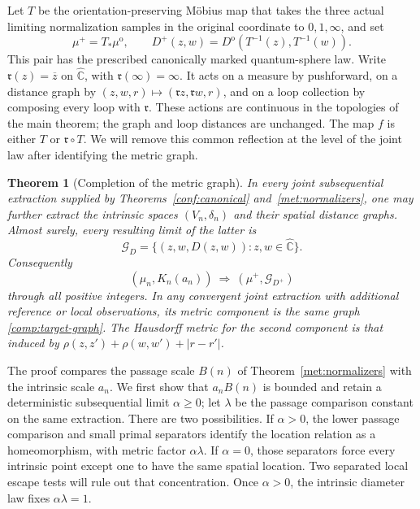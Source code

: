 \documentclass[11pt]{article}
\numberwithin{equation}{section}
\newtheorem{theorem}{Theorem}[section]
\theoremstyle{definition}
\theoremstyle{remark}
\newcommand{\Chat}{\widehat{\mathbb C}}
\newcommand{\1}{\mathbf 1}
\begin{document}
Let $T$ be the orientation-preserving M\"obius map that takes the
three actual limiting normalization samples in the original coordinate
to $0,1,\infty$, and set
\[
 \mu^+=T_*\mu^{\mathrm o},\qquad
 D^+(z,w)=D^{\mathrm o}(T^{-1}(z),T^{-1}(w)).
\]
This pair has the prescribed canonically marked quantum-sphere law.
Write $\mathfrak r(z)=\overline z$ on $\Chat$, with
$\mathfrak r(\infty)=\infty$.  It acts on a measure by pushforward,
on a distance graph by
$(z,w,r)\mapsto(\mathfrak r z,\mathfrak r w,r)$, and on a loop
collection by composing every loop with $\mathfrak r$.  These actions
are continuous in the topologies of the main theorem; the graph and
loop distances are unchanged.  The map $f$ is either $T$ or
$\mathfrak r\circ T$.  We will remove this common reflection at
the level of the joint law after identifying the metric graph.

\begin{theorem}[Completion of the metric graph]
\label{comp:metric-graph}
In every joint subsequential extraction supplied by
Theorems~\ref{conf:canonical} and~\ref{met:normalizers}, one may further
extract the intrinsic spaces $(V_n,\delta_n)$ and their spatial distance
graphs.  Almost surely, every resulting limit of the latter is
\begin{equation}
 \label{comp:target-graph}
 \mathcal G_D
   =\{(z,w,D(z,w)):z,w\in\Chat\}.
\end{equation}
Consequently
\[
 (\mu_n,K_n(a_n))\ \Longrightarrow\ (\mu^+,\mathcal G_{D^+})
\]
through all positive integers.  In any convergent joint extraction
with additional reference or local observations, its metric
component is the same graph \eqref{comp:target-graph}.  The
Hausdorff metric for the second component is that induced by
$\rho(z,z')+\rho(w,w')+|r-r'|$.
\end{theorem}

The proof compares the passage scale $B(n)$ of
Theorem~\ref{met:normalizers} with the intrinsic scale $a_n$.
We first show that $a_nB(n)$ is bounded and retain a deterministic
subsequential limit $\alpha\geq0$; let $\lambda$ be the passage
comparison constant on the same extraction.  There are two possibilities.
If $\alpha>0$, the lower passage comparison and small primal
separators identify the location relation as a homeomorphism, with
metric factor $\alpha\lambda$.  If $\alpha=0$, those separators
force every intrinsic point except one to have the same spatial
location.  Two separated local escape tests will rule out that
concentration.  Once $\alpha>0$, the intrinsic diameter law fixes
$\alpha\lambda=1$.
\end{document}
